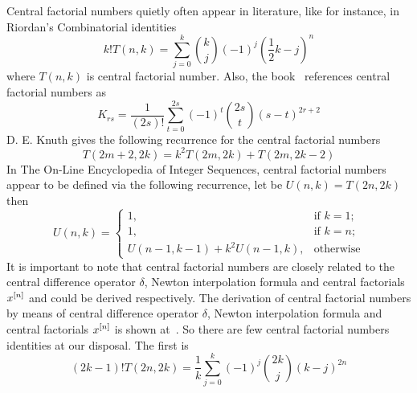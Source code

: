 Central factorial numbers quietly often appear in literature, like for instance, in Riordan's
Combinatorial identities~\cite{riordan1968combinatorial}
\begin{equation}
    k! T(n,k) = \sum_{j=0}^{k} \binom{k}{j} (-1)^{j} \left( \frac{1}{2}k - j \right)^{n}
    \label{eq:cfn-riordan}
\end{equation}
where $T(n,k)$ is central factorial number.
Also, the book~\cite{carlitz_riordan_1963} references central factorial numbers as
\begin{equation*}
    K_{rs} = \frac{1}{(2s)!} \sum_{t=0}^{2s} (-1)^t \binom{2s}{t} (s-t)^{2r+2}
\end{equation*}
D. E. Knuth gives the following recurrence for the central factorial numbers~\cite{knuth1993johann}
\begin{equation*}
    T(2m+2, 2k) = k^2 T(2m,2k) + T(2m, 2k - 2)
\end{equation*}
In The On-Line Encyclopedia of Integer Sequences, central factorial numbers~\cite{sloane2000centralfactorial}
appear to be defined via the following recurrence, let be $U(n,k) = T(2n,2k)$ then
\begin{equation*}
    U(n,k) = \begin{cases}
        1, & \text{if } k=1; \\
        1, & \text{if } k=n; \\
        U(n-1, k-1) + k^2 U(n-1, k), & \text{otherwise}
    \end{cases}
\end{equation*}
It is important to note that central factorial numbers are closely related to the central difference operator $\delta$,
Newton interpolation formula and central factorials $x^{[n]}$ and could be derived respectively.
The derivation of central factorial numbers by means of central difference operator $\delta$,
Newton interpolation formula and central factorials $x^{[n]}$
is shown at~\cite{scheuer2020mathstackexchange}.
So there are few central factorial numbers identities at our disposal.
The first is
\begin{equation}
(2k-1)
    !T(2n,2k) = \frac{1}{k} \sum_{j=0}^{k} (-1)^j \binom{2k}{j} (k-j)^{2n}\label{eq:cfn-identity-1}
\end{equation}
